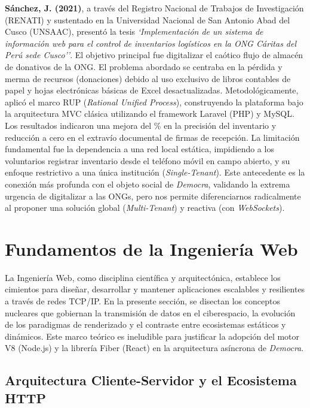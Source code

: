 \documentclass[11pt,a4paper,oneside]{report}
\begin{document}
\textbf{S\'anchez, J. (2021)}, a trav\'es del Registro Nacional de Trabajos de Investigaci\'on (RENATI) y sustentado en la Universidad Nacional de San Antonio Abad del Cusco (UNSAAC), present\'o la tesis \textit{`Implementaci\'on de un sistema de informaci\'on web para el control de inventarios log\'isticos en la ONG C\'aritas del Per\'u sede Cusco''}. El objetivo principal fue digitalizar el ca\'otico flujo de almac\'en de donativos de la ONG. El problema abordado se centraba en la p\'erdida y merma de recursos (donaciones) debido al uso exclusivo de libros contables de papel y hojas electr\'onicas b\'asicas de Excel desactualizadas. Metodol\'ogicamente, aplic\'o el marco RUP (\textit{Rational Unified Process}), construyendo la plataforma bajo la arquitectura MVC cl\'asica utilizando el framework Laravel (PHP) y MySQL. Los resultados indicaron una mejora del \% en la precisi\'on del inventario y reducci\'on a cero en el extrav\'io documental de firmas de recepci\'on. La limitaci\'on fundamental fue la dependencia a una red local est\'atica, impidiendo a los voluntarios registrar inventario desde el tel\'efono m\'ovil en campo abierto, y su enfoque restrictivo a una \'unica instituci\'on (\textit{Single-Tenant}). Este antecedente es la conexi\'on m\'as profunda con el objeto social de \textit{Democra}, validando la extrema urgencia de digitalizar a las ONGs, pero nos permite diferenciarnos radicalmente al proponer una soluci\'on global (\textit{Multi-Tenant}) y reactiva (con \textit{WebSockets}).


\section{Fundamentos de la Ingenier\'ia Web}

La Ingenier\'ia Web, como disciplina cient\'ifica y arquitect\'onica, establece los cimientos para dise\~nar, desarrollar y mantener aplicaciones escalables y resilientes a trav\'es de redes TCP/IP. En la presente secci\'on, se disectan los conceptos nucleares que gobiernan la transmisi\'on de datos en el ciberespacio, la evoluci\'on de los paradigmas de renderizado y el contraste entre ecosistemas est\'aticos y din\'amicos. Este marco te\'orico es ineludible para justificar la adopci\'on del motor V8 (Node.js) y la librer\'ia Fiber (React) en la arquitectura as\'incrona de \textit{Democra}.

\subsection{Arquitectura Cliente-Servidor y el Ecosistema HTTP}
\end{document}
